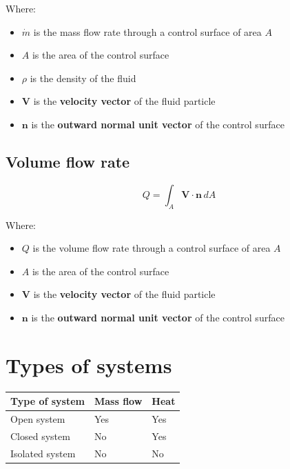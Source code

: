 \documentclass[11pt]{article}
\begin{document}
Where:
\begin{itemize}
\item \(\dot{m}\) is the mass flow rate through a control surface of area \(A\)
\item \(A\) is the area of the control surface
\item \(\rho\) is the density of the fluid
\item \(\boldsymbol{V}\) is the \textbf{velocity vector} of the fluid particle
\item \(\boldsymbol{n}\) is the \textbf{outward normal unit vector} of the control surface
\end{itemize}

\subsection{Volume flow rate}
\label{sec:org3f823fa}
\[Q = \int_A \boldsymbol{V} \cdot \boldsymbol{n} \, dA\]

Where:
\begin{itemize}
\item \(Q\) is the volume flow rate through a control surface of area \(A\)
\item \(A\) is the area of the control surface
\item \(\boldsymbol{V}\) is the \textbf{velocity vector} of the fluid particle
\item \(\boldsymbol{n}\) is the \textbf{outward normal unit vector} of the control surface
\end{itemize}

\newpage

\section{Types of systems}
\label{sec:org591dd64}
\begin{center}
\begin{tabular}{l|l|l}
Type of system & Mass flow & Heat\\[0pt]
\hline
Open system & Yes & Yes\\[0pt]
Closed system & No & Yes\\[0pt]
Isolated system & No & No\\[0pt]
\end{tabular}
\end{center}
\end{document}
